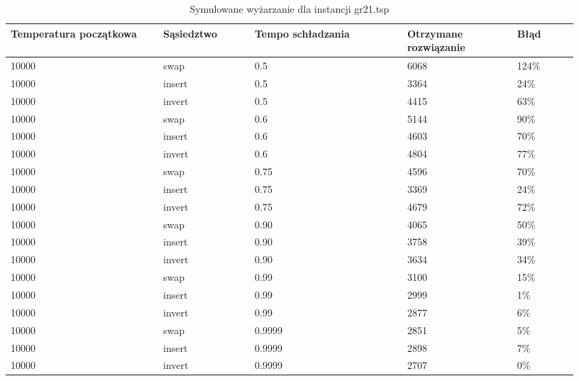 \documentclass[12pt,a4paper,titlepage]{article}
\begin{document}
\begin{table}[H]
    \centering
	{\begin{tabular}{|p{0.25\linewidth}p{0.15\linewidth}p{0.25\linewidth}p{0.18\linewidth}p{0.1\linewidth}|}
		\hline
        Temperatura początkowa & Sąsiedztwo & Tempo schładzania & Otrzymane rozwiązanie & Błąd \\
		\hline
        10000 & swap&0.5 & 6068 & 124\% \\
        10000 & insert&0.5 & 3364 & 24\% \\
        10000 & invert&0.5 & 4415 & 63\% \\
        \hline
        10000 &swap& 0.6 & 5144 & 90\% \\
        10000 &insert& 0.6 & 4603 & 70\% \\
        10000 &invert& 0.6 & 4804 & 77\% \\
        \hline
        10000 &swap& 0.75 & 4596 & 70\% \\
        10000 &insert& 0.75 & 3369 & 24\% \\
        10000 &invert& 0.75 & 4679 & 72\% \\
        \hline
        10000 &swap& 0.90 & 4065 & 50\% \\
        10000 &insert& 0.90 & 3758 & 39\% \\
        10000 &invert& 0.90 & 3634 & 34\% \\
        \hline
        10000 &swap& 0.99 & 3100 & 15\% \\
        10000 &insert& 0.99 & 2999 & 1\% \\
        10000 &invert& 0.99 & 2877 & 6\% \\
        \hline
        10000 &swap& 0.9999 & 2851 & 5\% \\
        10000 &insert& 0.9999 & 2898 & 7\% \\
        10000 &invert& 0.9999 & 2707 & 0\% \\
        \hline
	\end{tabular}}
	\caption{Symulowane wyżarzanie dla instancji gr21.tsp}
\end{table}
\end{document}
